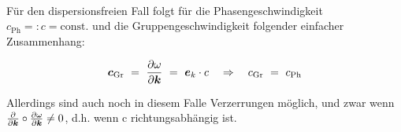 \ \\
Für den dispersionsfreien Fall folgt für die Phasengeschwindigkeit $c_{\text{Ph}} =: c = \text{const.}$ und die Gruppengeschwindigkeit folgender einfacher Zusammenhang:

\begin{equation*}
\vec{c}_{\text{Gr}} \ = \ \pdiff{\omega}{\vec{k}} \ = \ \vec{e}_k\cdot c \quad\Rightarrow\quad c_{\text{Gr}} \ = \ c_{\text{Ph}}
\end{equation*}

Allerdings sind auch noch in diesem Falle Verzerrungen möglich, und zwar wenn $\frac{\partial{}}{\partial{\bm{k}}}\circ\frac{\partial{\omega}}{\partial{\bm{k}}}\neq 0$, d.h. wenn c richtungsabhängig ist.